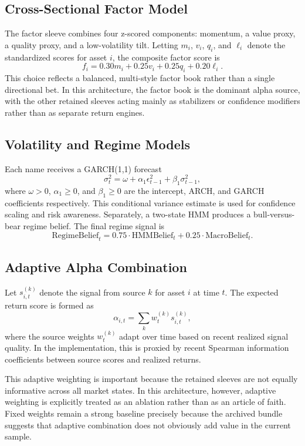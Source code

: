 \documentclass[10pt,twocolumn]{article}
\begin{document}
\subsection{Cross-Sectional Factor Model}

The factor sleeve combines four z-scored components: momentum, a value proxy, a
quality proxy, and a low-volatility tilt. Letting $m_i$, $v_i$, $q_i$, and
$\ell_i$ denote the standardized scores for asset $i$, the composite factor
score is
\[
f_i = 0.30 m_i + 0.25 v_i + 0.25 q_i + 0.20 \ell_i.
\]
This choice reflects a balanced, multi-style factor book rather than a single
directional bet. In this architecture, the factor book is the dominant alpha
source, with the other retained sleeves acting mainly as stabilizers or
confidence modifiers rather than as separate return engines.

\subsection{Volatility and Regime Models}

Each name receives a GARCH(1,1) forecast
\[
\sigma_t^2 = \omega + \alpha_1 \epsilon_{t-1}^2 + \beta_1 \sigma_{t-1}^2,
\]
where $\omega > 0$, $\alpha_1 \geq 0$, and $\beta_1 \geq 0$ are the intercept,
ARCH, and GARCH coefficients respectively. This conditional variance estimate
is used for confidence scaling and risk awareness. Separately, a two-state HMM
produces a bull-versus-bear regime belief. The final regime signal is
\[
\text{RegimeBelief}_t =
0.75 \cdot \text{HMMBelief}_t +
0.25 \cdot \text{MacroBelief}_t.
\]

\subsection{Adaptive Alpha Combination}

Let $s^{(k)}_{i,t}$ denote the signal from source $k$ for asset $i$ at time $t$.
The expected return score is formed as
\[
\alpha_{i,t} = \sum_k w^{(k)}_t s^{(k)}_{i,t},
\]
where the source weights $w^{(k)}_t$ adapt over time based on recent realized
signal quality. In the implementation, this is proxied by recent Spearman
information coefficients between source scores and realized returns.

This adaptive weighting is important because the retained sleeves are not
equally informative across all market states. In this architecture, however,
adaptive weighting is explicitly treated as an ablation rather than as an
article of faith. Fixed weights remain a strong baseline precisely because the
archived bundle suggests that adaptive combination does not obviously add value
in the current sample.
\end{document}
